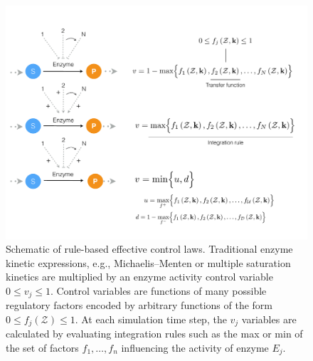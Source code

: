 \documentclass[12pt]{article}
\begin{document}
\begin{figure}
\centering
\includegraphics[width=1.0\textwidth]{./figs/Figure-2-ControlSchematic.pdf}
\caption{Schematic of rule-based effective control laws. 
Traditional enzyme kinetic expressions, e.g., Michaelis–Menten or multiple saturation kinetics are multiplied by an enzyme activity control variable $0 \leq v_{j} \leq 1 $. 
Control variables are functions of many possible regulatory factors encoded by arbitrary functions of the form $0\leq f_{j}\left(\mathcal{Z}\right)\leq 1$.
At each simulation time step, the $v_{j}$ variables are calculated by evaluating integration rules such as the max or min of the set of factors $f_{1},\hdots,f_{n}$ 
influencing the activity of enzyme $E_{j}$. }\label{fig-control-schematic}
\end{figure}

\clearpage
\end{document}
